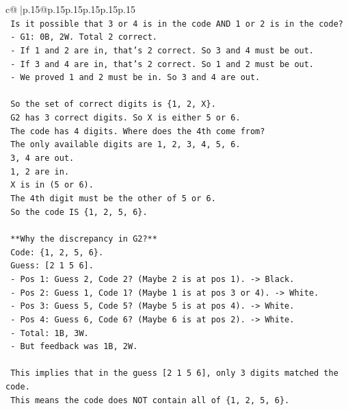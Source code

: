 \documentclass{article}
\begin{document}
{\begin{supertabular}{c@{$\;$}|p{.15\linewidth}@{}p{.15\linewidth}p{.15\linewidth}p{.15\linewidth}p{.15\linewidth}p{.15\linewidth}}
{{{\\ 
\texttt{    Is it possible that 3 or 4 is in the code AND 1 or 2 is in the code?} \\
\texttt{    {-} G1: 0B, 2W. Total 2 correct.} \\
\texttt{    {-} If 1 and 2 are in, that's 2 correct. So 3 and 4 must be out.} \\
\texttt{    {-} If 3 and 4 are in, that's 2 correct. So 1 and 2 must be out.} \\
\texttt{    {-} We proved 1 and 2 must be in. So 3 and 4 are out.} \\
\\ 
\texttt{    So the set of correct digits is \{1, 2, X\}.} \\
\texttt{    G2 has 3 correct digits. So X is either 5 or 6.} \\
\texttt{    The code has 4 digits. Where does the 4th come from?} \\
\texttt{    The only available digits are 1, 2, 3, 4, 5, 6.} \\
\texttt{    3, 4 are out.} \\
\texttt{    1, 2 are in.} \\
\texttt{    X is in (5 or 6).} \\
\texttt{    The 4th digit must be the other of 5 or 6.} \\
\texttt{    So the code IS \{1, 2, 5, 6\}.} \\
\\ 
\texttt{    **Why the discrepancy in G2?**} \\
\texttt{    Code: \{1, 2, 5, 6\}.} \\
\texttt{    Guess: {[}2 1 5 6{]}.} \\
\texttt{    {-} Pos 1: Guess 2, Code 2? (Maybe 2 is at pos 1). {-}> Black.} \\
\texttt{    {-} Pos 2: Guess 1, Code 1? (Maybe 1 is at pos 3 or 4). {-}> White.} \\
\texttt{    {-} Pos 3: Guess 5, Code 5? (Maybe 5 is at pos 4). {-}> White.} \\
\texttt{    {-} Pos 4: Guess 6, Code 6? (Maybe 6 is at pos 2). {-}> White.} \\
\texttt{    {-} Total: 1B, 3W.} \\
\texttt{    {-} But feedback was 1B, 2W.} \\
\\ 
\texttt{    This implies that in the guess {[}2 1 5 6{]}, only 3 digits matched the code.} \\
\texttt{    This means the code does NOT contain all of \{1, 2, 5, 6\}.} \\
}}}
\end{supertabular}}
\end{document}
